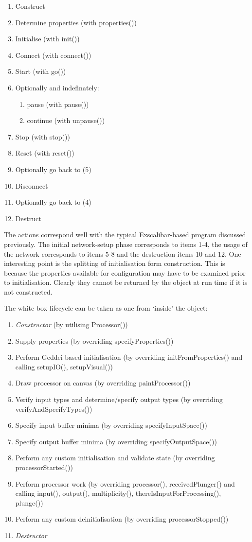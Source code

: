 \begin{enumerate}
\item Construct
\item Determine properties (with properties())
\item Initialise (with init())
\item Connect (with connect())
\item Start (with go())
\item Optionally and indefinately:
\begin{enumerate}
\item pause (with pause())
\item continue (with unpause())
\end{enumerate}
\item Stop (with stop())
\item Reset (with reset())
\item Optionally go back to (5)
\item Disconnect
\item Optionally go back to (4)
\item Destruct
\end{enumerate}

The actions correspond well with the typical Exscalibar-based program discussed previously. The initial network-setup phase corresponds to items 1-4, the usage of the network corresponds to items 5-8 and the destruction items 10 and 12. One interesting point is the splitting of initialisation form construction. This is because the properties available for configuration may have to be examined prior to initialisation. Clearly they cannot be returned by the object at run time if it is not constructed.

The white box lifecycle can be taken as one from `inside' the object:

\begin{enumerate}
\item \textit{Constructor} (by utilising Processor())
\item Supply properties (by overriding specifyProperties())
\item Perform Geddei-based initialisation (by overriding initFromProperties() and calling setupIO(), setupVisual())
\item Draw processor on canvas (by overriding paintProcessor())
\item Verify input types and determine/specify output types (by overriding verifyAndSpecifyTypes())
\item Specify input buffer minima (by overriding specifyInputSpace())
\item Specify output buffer minima (by overriding specifyOutputSpace())
\item Perform any custom initialisation and validate state (by overriding processorStarted())
\item Perform processor work (by overriding processor(), receivedPlunger() and calling input(), output(), multiplicity(), thereIsInputForProcessing(), plunge())
\item Perform any custom deinitialisation (by overriding processorStopped())
\item \textit{Destructor}
\end{enumerate}

